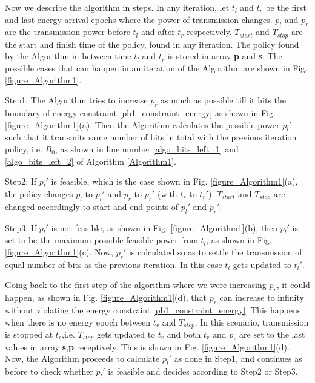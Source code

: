 Now we describe the algorithm in steps. In any iteration, let $t_{l}$ and $t_{r}$ be the first and last energy arrival epochs where the power of transmission changes. $p_l$ and $p_r$ are the transmission power before $t_l$ and after $t_r$ respectively. $T_{start}$ and $T_{stop}$ are the start and finish time of the policy, found in any iteration. The policy found by the Algorithm in-between time $t_l$ and $t_r$ is stored in array \textbf{p} and \textbf{s}. The possible cases that can happen in an iteration of the Algorithm are shown in Fig. \ref{figure_Algorithm1}. 

Step1: The Algorithm tries to increase $p_r$ as much as possible till it hits the boundary of energy constraint \eqref{pb1_constraint_energy} as shown in Fig. \ref{figure_Algorithm1}(a). Then the Algorithm calculates the possible power $p_l'$ such that it transmits same number of bits in total with the previous iteration policy, i.e. $B_0$, as shown in line number \ref{algo_bits_left_1} and \ref{algo_bits_left_2} of Algorithm \ref{Algorithm1}. 

Step2: If $p_l'$ is feasible, which is the case shown in Fig. \ref{figure_Algorithm1}(a), the policy changes $p_l$ to $p_l'$ and $p_r$ to $p_r'$ (with $t_r$ to $t_r'$). $T_{start}$ and $T_{stop}$ are changed accordingly to start and end points of $p_l'$  and $p_r'$. 

Step3: If $p_l'$ is not feasible, as shown in Fig. \ref{figure_Algorithm1}(b), then $p_l'$ is set to be the maximum possible feasible power from $t_l$, as shown in Fig. \ref{figure_Algorithm1}(c). Now, $p_r'$ is calculated so as to settle the transmission of equal number of bits as the previous iteration. 
In this case $t_l$ gets updated to $t_l'$.  

Going back to the first step of the algorithm where we were increasing $p_r$, it could happen, as shown in Fig. \ref{figure_Algorithm1}(d), that $p_r$ can increase to infinity without violating the energy constraint \eqref{pb1_constraint_energy}. This happens when there is no energy epoch between $t_r$ and $T_{stop}$. In this scenario, transmission is stopped at $t_r$,i.e. $T_{stop}$ gets updated to $t_r$ and both $t_r$ and $p_r$ are set to the last values in array \textbf{s},\textbf{p} receptively. This is shown in Fig. \ref{figure_Algorithm1}(d). Now, the Algorithm proceeds to calculate $p_l'$ as done in Step1, and continues as before to check whether $p_l'$ is feasible and decides according to Step2 or Step3.


